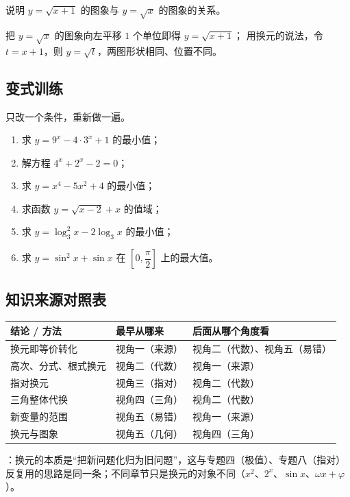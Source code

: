 \begin{explore}
\begin{problem}
说明 $y=\sqrt{x+1}$ 的图象与 $y=\sqrt x$ 的图象的关系。
\end{problem}
\begin{solution}
把 $y=\sqrt x$ 的图象向左平移 $1$ 个单位即得 $y=\sqrt{x+1}$；
用换元的说法，令 $t=x+1$，则 $y=\sqrt t$，两图形状相同、位置不同。
\end{solution}
\end{explore}

\begin{inclasstest}
\subsection{变式训练}
只改一个条件，重新做一遍。
\begin{enumerate}
  \item 求 $y=9^x-4\cdot3^x+1$ 的最小值；
  \item 解方程 $4^x+2^x-2=0$；
  \item 求 $y=x^4-5x^2+4$ 的最小值；
  \item 求函数 $y=\sqrt{x-2}+x$ 的值域；
  \item 求 $y=\log_3^2 x-2\log_3 x$ 的最小值；
  \item 求 $y=\sin^2 x+\sin x$ 在 $\left[0,\dfrac{\pi}{2}\right]$ 上的最大值。
\end{enumerate}
\end{inclasstest}

\begin{afterclass}
\subsection{知识来源对照表}
\begin{center}
\footnotesize
\setlength{\tabcolsep}{4pt}
\renewcommand{\arraystretch}{1.35}
\begin{tabular}{p{3.4cm}p{4.0cm}p{5.6cm}}
\toprule
结论 / 方法 & 最早从哪来 & 后面从哪个角度看 \\
\midrule
换元即等价转化 & 视角一（来源） & 视角二（代数）、视角五（易错） \\
高次、分式、根式换元 & 视角二（代数） & 视角一（来源） \\
指对换元 & 视角三（指对） & 视角二（代数） \\
三角整体代换 & 视角四（三角） & 视角二（代数） \\
新变量的范围 & 视角五（易错） & 视角一（来源） \\
换元与图象 & 视角五（几何） & 视角四（三角） \\
\bottomrule
\end{tabular}
\end{center}

：换元的本质是“把新问题化归为旧问题”，这与专题四（极值）、专题八（指对）
反复用的思路是同一条；不同章节只是换元的对象不同（$x^2$、$2^x$、$\sin x$、$\omega x+\varphi$）。
\end{afterclass}
